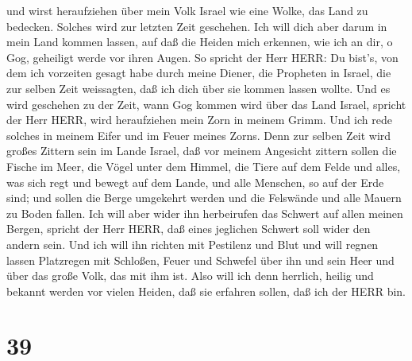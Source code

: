  und wirst heraufziehen über mein Volk Israel wie eine
Wolke, das Land zu bedecken. Solches wird zur letzten Zeit geschehen.
Ich will dich aber darum in mein Land kommen lassen, auf daß die Heiden
mich erkennen, wie ich an dir, o Gog, geheiligt werde vor ihren Augen.
 So spricht der Herr HERR: Du bist's, von dem ich vorzeiten
gesagt habe durch meine Diener, die Propheten in Israel, die zur selben
Zeit weissagten, daß ich dich über sie kommen lassen wollte.
 Und es wird geschehen zu der Zeit, wann Gog kommen wird
über das Land Israel, spricht der Herr HERR, wird heraufziehen mein Zorn
in meinem Grimm.  Und ich rede solches in meinem Eifer und
im Feuer meines Zorns. Denn zur selben Zeit wird großes Zittern sein im
Lande Israel,  daß vor meinem Angesicht zittern sollen die
Fische im Meer, die Vögel unter dem Himmel, die Tiere auf dem Felde und
alles, was sich regt und bewegt auf dem Lande, und alle Menschen, so auf
der Erde sind; und sollen die Berge umgekehrt werden und die Felswände
und alle Mauern zu Boden fallen.  Ich will aber wider ihn
herbeirufen das Schwert auf allen meinen Bergen, spricht der Herr HERR,
daß eines jeglichen Schwert soll wider den andern sein. 
Und ich will ihn richten mit Pestilenz und Blut und will regnen lassen
Platzregen mit Schloßen, Feuer und Schwefel über ihn und sein Heer und
über das große Volk, das mit ihm ist.  Also will ich denn
herrlich, heilig und bekannt werden vor vielen Heiden, daß sie erfahren
sollen, daß ich der HERR bin.

\hypertarget{section-38}{%
\section{39}\label{section-38}}

